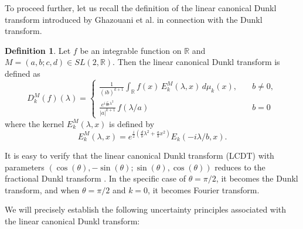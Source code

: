 \documentclass[12pt,a4paper,reqno]{amsproc}
\theoremstyle{definition}
\newtheorem{definition}[theorem]{Definition}
\theoremstyle{remark}
\numberwithin{equation}{section}
\begin{document}
To proceed further, let us recall the definition of the linear canonical Dunkl transform introduced by Ghazouani et al. \cite{ghazouani2017unified} in connection with the Dunkl transform.  
\begin{definition} \label{D:1}
Let $f$ be an integrable function on $\mathbb{R}$ and $M=(a,b;c,d)\in SL(2,\mathbb{R})$.  Then the  linear canonical Dunkl transform is defined as \cite{ghazouani2017unified} 
\begin{equation*} 
 D_k^M(f)(\lambda) = \left \{\begin{array}{ll} \frac{1}{(ib)^{k +1}}  \int_{\mathbb{R}}  f(x)\, E_k^M(\lambda,x)\,d\mu_k(x), \quad & b \neq 0, 
 \\
 \frac{e^{i\frac{c}{2a}\lambda^2}}{|a|^{k+1}}\,f(\lambda/a) & b=0
 \end{array}\right.
\end{equation*}
where the kernel $E^M_{k}(\lambda,x)$ is defined by 
\begin{equation*}
E^M_{k}(\lambda,x) = e^{\frac{i}{2}(\frac{d}{b}\lambda^2+\frac{a}{b}x^2)}E_{k}(-i\lambda/b,x). 
\end{equation*}
\end{definition}
It is easy to verify that the linear canonical Dunkl transform (LCDT) with parameters $(\cos(\theta), -\sin(\theta); \sin(\theta), \cos(\theta))$ reduces to the fractional Dunkl transform \cite{gh}. In the specific case of $\theta=\pi/2$, it becomes the Dunkl transform, and when $\theta=\pi/2$ and $k=0$, it becomes Fourier transform.

We will precisely establish the following uncertainty principles associated with the linear canonical Dunkl transform:
\end{document}
